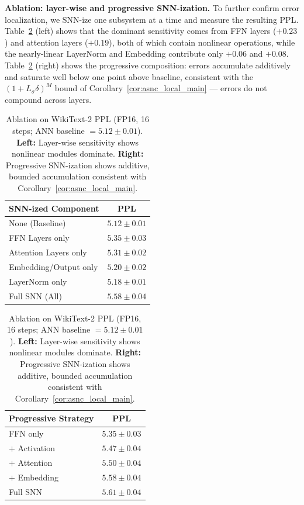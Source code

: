 \documentclass{article}
\theoremstyle{plain}
\theoremstyle{definition}
\theoremstyle{remark}
\begin{document}
\noindent\textbf{Ablation: layer-wise and progressive SNN-ization.}
To further confirm error localization, we SNN-ize one subsystem at a time and measure
the resulting PPL. Table~\ref{tab:ablation} (left) shows that the dominant
sensitivity comes from FFN layers ($+0.23$) and attention layers ($+0.19$), both of
which contain nonlinear operations, while the nearly-linear LayerNorm and Embedding
contribute only $+0.06$ and $+0.08$. Table~\ref{tab:ablation} (right) shows the
progressive composition: errors accumulate additively and saturate well below one
point above baseline, consistent with the $(1 + L_\sigma\delta)^M$ bound of
Corollary~\ref{cor:asnc_local_main} — errors do not compound across layers.

\begin{table}[h!]
\centering
\caption{Ablation on WikiText-2 PPL (FP16, 16 steps; ANN baseline $= 5.12 \pm
0.01$). \textbf{Left:} Layer-wise sensitivity shows nonlinear modules dominate.
\textbf{Right:} Progressive SNN-ization shows additive, bounded accumulation
consistent with Corollary~\ref{cor:asnc_local_main}.}
\label{tab:ablation}
\vspace{0.4em}
\begin{minipage}[t]{0.48\textwidth}
\centering
\small
\begin{tabular}{lc}
\toprule
\textbf{SNN-ized Component} & \textbf{PPL} \\
\midrule
None (Baseline)           & $5.12 \pm 0.01$ \\
FFN Layers only           & $5.35 \pm 0.03$ \\
Attention Layers only     & $5.31 \pm 0.02$ \\
Embedding/Output only     & $5.20 \pm 0.02$ \\
LayerNorm only            & $5.18 \pm 0.01$ \\
Full SNN (All)            & $5.58 \pm 0.04$ \\
\bottomrule
\end{tabular}
\end{minipage}
\hfill
\begin{minipage}[t]{0.48\textwidth}
\centering
\small
\begin{tabular}{lc}
\toprule
\textbf{Progressive Strategy} & \textbf{PPL} \\
\midrule
FFN only                & $5.35 \pm 0.03$ \\
$+$ Activation          & $5.47 \pm 0.04$ \\
$+$ Attention           & $5.50 \pm 0.04$ \\
$+$ Embedding           & $5.58 \pm 0.04$ \\
Full SNN                & $5.61 \pm 0.04$ \\
\bottomrule
\end{tabular}
\end{minipage}
\end{table}
\end{document}
